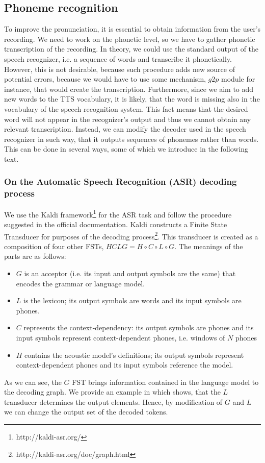 \subsection{Phoneme recognition}
\label{ph-rec}
To improve the pronunciation, it is essential to obtain information from the user's recording.
We need to work on the phonetic level, so we have to gather phonetic transcription of the recording.
In theory, we could use the standard output of the speech recognizer, i.e. a sequence of words and transcribe it phonetically.
However, this is not desirable, because such procedure adds new source of potential errors, because we would have to use some mechanism, $g2p$ module for instance, that would create the transcription.
Furthermore, since we aim to add new words to the TTS vocabulary, it is likely, that the word is missing also in the vocabulary of the speech recognition system.
This fact means that the desired word will not appear in the recognizer's output and thus we cannot obtain any relevant transcription.
Instead, we can modify the decoder used in the speech recognizer in such way, that it outputs sequences of phonemes rather than words.
This can be done in several ways, some of which we introduce in the following text.
\subsubsection{On the Automatic Speech Recognition (ASR) decoding process}
\label{asr-decoding}
We use the Kaldi framework\footnote{http://kaldi-asr.org/} for the ASR task and follow the procedure suggested in the official documentation.
Kaldi constructs a Finite State Transducer for purposes of the decoding process\footnote{http://kaldi-asr.org/doc/graph.html}.
This transducer is created as a composition of four other FSTs, $HCLG = H \circ C \circ L \circ G$.
The meanings of the parts are as follows:
\begin{itemize}
\item $G$ is an acceptor (i.e. its input and output symbols are the same) that encodes the grammar or language model.
\item $L$ is the lexicon; its output symbols are words and its input symbols are phones.
\item $C$ represents the context-dependency: its output symbols are phones and its input symbols represent context-dependent phones, i.e. windows of $N$ phones
\item $H$ contains the acoustic model's definitions; its output symbols represent context-dependent phones and its input symbols reference the model.
\end{itemize}
As we can see, the $G$ FST brings information contained in the language model to the decoding graph.
We provide an example in  which shows, that the $L$ transducer determines the output elements.
Hence, by modification of $G$ and $L$ we can change the output set of the decoded tokens.
